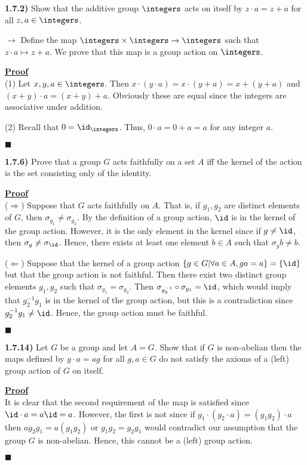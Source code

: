 \documentclass[12pt,a4paper]{article}
\newcommand{\prob}[2]{\textbf{#1)} #2}
\newenvironment{proof}
{
\textbf{\underline{Proof}} \\
}
{
\begin{flushright}
$\blacksquare$
\end{flushright}}
\begin{document}
\prob{1.7.2}{Show that the additive group $\integers$ acts on itself by $z \cdot a = z + a$ for all $z,a \in \integers$.}

$\rightarrow$ Define the map $\integers \times \integers \rightarrow \integers$ such that $z \cdot a \mapsto z + a$. We prove that this map is a group action on $\integers$.

\begin{proof}
(1) Let $x,y,a \in \integers$. Then $x \cdot (y \cdot a) = x \cdot (y + a) = x + (y + a)$ and $(x + y) \cdot a = (x + y) + a$. Obviously these are equal since the integers are associative under addition.

(2) Recall that $0 = \id_{\integers}$. Thus, $0 \cdot a = 0 + a = a$ for any integer $a$.
\end{proof}

\prob{1.7.6}{Prove that a group $G$ acts faithfully on a set $A$ iff the kernel of the action is the set consisting only of the identity.}

\begin{proof}
($\Rightarrow$) Suppose that $G$ acts faithfully on $A$. That is, if $g_1,g_2$ are distinct elements of $G$, then $\sigma_{g_1} \not= \sigma_{g_2}$. By the definition of a group action, $\id$ is in the kernel of the group action. However, it is the only element in the kernel since if $g \not= \id$, then $\sigma_{g} \not= \sigma_{\id}$. Hence, there exists at least one element $b \in A$ such that $\sigma_g b \not= b$.

($\Leftarrow$) Suppose that the kernel of a group action $\{g \in G | \forall a \in A, ga = a\} = \{\id\}$ but that the group action is not faithful. Then there exist two distinct group elements $g_1,g_2$ such that $\sigma_{g_1} = \sigma_{g_2}$. Then $\sigma_{g_2^{-1}} \circ \sigma_{g_1} = \id$, which would imply that $g_2^{-1}g_1$ is in the kernel of the group action, but this is a contradiction since $g_2^{-1}g_1 \not= \id$. Hence, the group action must be faithful.
\end{proof}

\prob{1.7.14}{Let $G$ be a group and let $A = G$. Show that if $G$ is non-abelian then the maps defined by $g \cdot a = ag$ for all $g,a \in G$ do not satisfy the axioms of a (left) group action of $G$ on itself.}

\begin{proof}
It is clear that the second requirement of the map is satisfied since $\id \cdot a = a\id = a$. However, the first is not since if $g_1 \cdot (g_2 \cdot a) = (g_1g_2) \cdot a$ then $ag_2g_1 = a(g_1g_2)$ or $g_1g_2 = g_2g_1$ would contradict our assumption that the group $G$ is non-abelian. Hence, this cannot be a (left) group action.
\end{proof}
\end{document}
